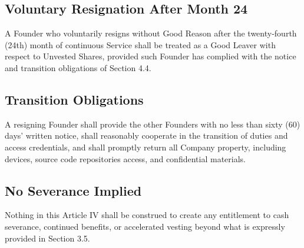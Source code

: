 \subsection{Voluntary Resignation After Month 24} A Founder who voluntarily resigns without Good Reason after the twenty-fourth (24th) month of continuous Service shall be treated as a Good Leaver with respect to Unvested Shares, provided such Founder has complied with the notice and transition obligations of Section 4.4.

\subsection{Transition Obligations} A resigning Founder shall provide the other Founders with no less than sixty (60) days' written notice, shall reasonably cooperate in the transition of duties and access credentials, and shall promptly return all Company property, including devices, source code repositories access, and confidential materials.

\subsection{No Severance Implied} Nothing in this Article IV shall be construed to create any entitlement to cash severance, continued benefits, or accelerated vesting beyond what is expressly provided in Section 3.5.
